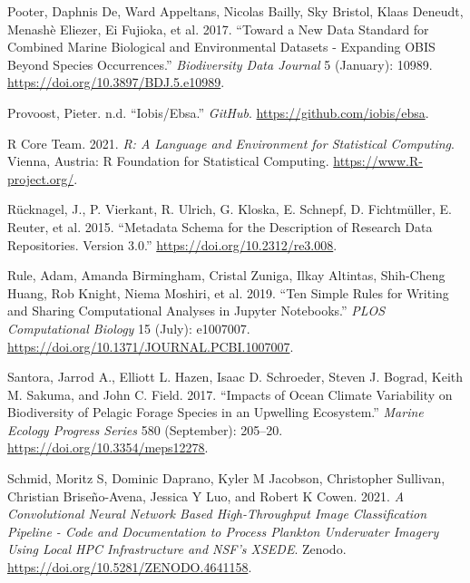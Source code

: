 \documentclass[
]{book}
\newlength{\cslhangindent}
\newlength{\cslentryspacingunit} %
\newenvironment{CSLReferences}[2] %
 {%
  \setlength{\parindent}{0pt}
  \ifodd #1
  \let\oldpar\par
  \def\par{\hangindent=\cslhangindent\oldpar}
  \fi
  \setlength{\parskip}{#2\cslentryspacingunit}
 }%
 {}
\begin{document}
\begin{CSLReferences}{1}{0}
\leavevmode{}%
Pooter, Daphnis De, Ward Appeltans, Nicolas Bailly, Sky Bristol, Klaas Deneudt, Menashè Eliezer, Ei Fujioka, et al. 2017. {``Toward a New Data Standard for Combined Marine Biological and Environmental Datasets - Expanding OBIS Beyond Species Occurrences.''} \emph{Biodiversity Data Journal} 5 (January): 10989. \url{https://doi.org/10.3897/BDJ.5.e10989}.

\leavevmode{}%
Provoost, Pieter. n.d. {``Iobis/Ebsa.''} \emph{GitHub}. \url{https://github.com/iobis/ebsa}.

\leavevmode{}%
R Core Team. 2021. \emph{R: A Language and Environment for Statistical Computing}. Vienna, Austria: R Foundation for Statistical Computing. \url{https://www.R-project.org/}.

\leavevmode{}%
Rücknagel, J., P. Vierkant, R. Ulrich, G. Kloska, E. Schnepf, D. Fichtmüller, E. Reuter, et al. 2015. {``Metadata Schema for the Description of Research Data Repositories. Version 3.0.''} \url{https://doi.org/10.2312/re3.008}.

\leavevmode{}%
Rule, Adam, Amanda Birmingham, Cristal Zuniga, Ilkay Altintas, Shih-Cheng Huang, Rob Knight, Niema Moshiri, et al. 2019. {``Ten Simple Rules for Writing and Sharing Computational Analyses in Jupyter Notebooks.''} \emph{PLOS Computational Biology} 15 (July): e1007007. \url{https://doi.org/10.1371/JOURNAL.PCBI.1007007}.

\leavevmode{}%
Santora, Jarrod A., Elliott L. Hazen, Isaac D. Schroeder, Steven J. Bograd, Keith M. Sakuma, and John C. Field. 2017. {``Impacts of Ocean Climate Variability on Biodiversity of Pelagic Forage Species in an Upwelling Ecosystem.''} \emph{Marine Ecology Progress Series} 580 (September): 205--20. \url{https://doi.org/10.3354/meps12278}.

\leavevmode{}%
Schmid, Moritz S, Dominic Daprano, Kyler M Jacobson, Christopher Sullivan, Christian Briseño-Avena, Jessica Y Luo, and Robert K Cowen. 2021. \emph{A Convolutional Neural Network Based High-Throughput Image Classification Pipeline - Code and Documentation to Process Plankton Underwater Imagery Using Local HPC Infrastructure and NSF's XSEDE}. Zenodo. \url{https://doi.org/10.5281/ZENODO.4641158}.


\end{CSLReferences}
\end{document}
